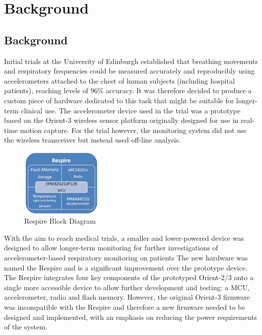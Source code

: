 \chapter{Background}

\section{Background}
Initial trials at the University of Edinburgh established that breathing movements and respiratory
frequencies could be measured accurately and reproducibly using accelerometers attached to the
chest of human subjects (including hospital patients), reaching levels of 96\% accuracy\cite{BatesLingMannArvind2010}.
It was therefore decided to produce a custom piece of hardware dedicated
to this task that might be suitable for longer-term clinical use. The accelerometer device used in the
trial was a prototype based on the Orient-3 wireless sensor platform originally designed for use in
real-time motion capture. For the trial however, the monitoring system did not use the wireless
transceiver but instead used off-line analysis.

\begin{figure}
  \vspace{-10pt}
  \begin{center}
    \includegraphics[width=0.35\textwidth, keepaspectratio=true]{images/respire_block.png}
  \end{center}
  \caption[Respire Block Diagram]{Respire Block Diagram}
  \vspace{-10pt}
\end{figure}

With the aim to reach medical trials, a smaller and lower-powered device was designed to allow
longer-term monitoring for further investigations of accelerometer-based respiratory monitoring on
patients The new hardware was named the Respire and is a significant improvement over the
prototype device. The Respire integrates four key components of the prototyped Orient-2/3 onto a
single more accessible device to allow further development and testing: a \ac{MCU},
accelerometer, radio and flash memory. However, the original Orient-3 firmware was incompatible
with the Respire and therefore a new firmware needed to be designed and implemented, with an
emphasis on reducing the power requirements of the system.

